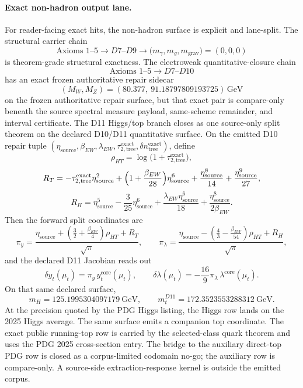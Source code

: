 \documentclass[11pt]{article}
\begin{document}
\paragraph{Exact non-hadron output lane.}
For reader-facing exact hits, the non-hadron surface is explicit and lane-split. The structural carrier chain
\[
\text{Axioms }1\text{--}5 \longrightarrow D7\text{--}D9 \longrightarrow
\bigl(m_\gamma,m_g,m_{\mathrm{grav}}\bigr)=(0,0,0)
\]
is theorem-grade structural exactness. The electroweak quantitative-closure chain
\[
\text{Axioms }1\text{--}5 \longrightarrow D7\text{--}D10
\]
has an exact frozen authoritative repair sidecar
\[
(M_W,M_Z)=
(80.377,\ 91.18797809193725)\,\mathrm{GeV}
\]
on the frozen authoritative repair surface, but that exact pair is compare-only beneath the source spectral measure payload, same-scheme remainder, and interval certificate. The D11 Higgs/top branch closes as one source-only split theorem on the declared D10/D11 quantitative surface. On the emitted D10 repair tuple \((\eta_{\mathrm{source}},\beta_{EW},\lambda_{EW},\tau_{2,\mathrm{tree}}^{\mathrm{exact}},\delta n_{\mathrm{tree}}^{\mathrm{exact}})\), define
\[
\rho_{HT}=\log\!\bigl(1+\tau_{2,\mathrm{tree}}^{\mathrm{exact}}\bigr),
\]
\[
R_T=
-\tau_{2,\mathrm{tree}}^{\mathrm{exact}}\eta_{\mathrm{source}}^2
+\Bigl(1+\frac{\beta_{EW}}{28}\Bigr)\eta_{\mathrm{source}}^6
+\frac{\eta_{\mathrm{source}}^8}{14}
+\frac{\eta_{\mathrm{source}}^9}{27},
\]
\[
R_H=
\eta_{\mathrm{source}}^5
-\frac{3}{25}\eta_{\mathrm{source}}^6
+\frac{\lambda_{EW}\eta_{\mathrm{source}}^6}{18}
+\frac{\eta_{\mathrm{source}}^8}{2\beta_{EW}}.
\]
Then the forward split coordinates are
\[
\pi_y=
\frac{\eta_{\mathrm{source}}+\left(\frac32+\frac{\beta_{EW}}4\right)\rho_{HT}+R_T}{\sqrt{\pi}},
\qquad
\pi_\lambda=
\frac{\eta_{\mathrm{source}}-\left(\frac43-\frac{\beta_{EW}}{54}\right)\rho_{HT}+R_H}{\sqrt{\pi}},
\]
and the declared D11 Jacobian reads out
\[
\delta y_t(\mu_t)=\pi_y\,y_t^{\mathrm{core}}(\mu_t),
\qquad
\delta\lambda(\mu_t)=-\frac{16}{9}\pi_\lambda\,\lambda^{\mathrm{core}}(\mu_t).
\]
On that same declared surface,
\[
m_H=125.1995304097179~\mathrm{GeV},
\qquad
m_t^{D11}=172.3523553288312~\mathrm{GeV}.
\]
At the precision quoted by the PDG Higgs listing, the Higgs row lands on the 2025 Higgs average. The
same surface emits a companion top coordinate. The exact public running-top row is carried by the
selected-class quark theorem and uses the PDG 2025 cross-section entry. The bridge to the auxiliary
direct-top PDG row is closed as a corpus-limited codomain no-go; the auxiliary row is compare-only.
A source-side extraction-response kernel is outside the emitted corpus.
\end{document}
